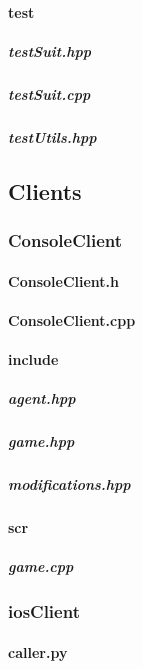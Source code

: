 \documentclass[12pt]{article}
\newcommand{\incFile}[2]{\label{code:#2}\newpage}
\begin{document}
\paragraph{test}																%
\subparagraph{testSuit.hpp}											\incFile{C++}{AlphaZeroPytorch/include/test/testSuit.hpp}	
\subparagraph{testSuit.cpp}											\incFile{C++}{AlphaZeroPytorch/include/test/testSuit.cpp}
\subparagraph{testUtils.hpp}											\incFile{C++}{AlphaZeroPytorch/include/test/testUtils.hpp}

\subsection{Clients}														%
\subsubsection{ConsoleClient}
\paragraph{ConsoleClient.h}											\incFile{C++}{Clients/ConsoleClient/ConsoleClient.h}
\paragraph{ConsoleClient.cpp}										\incFile{C++}{Clients/ConsoleClient/ConsoleClient.cpp}
\paragraph{include}														%
\subparagraph{agent.hpp}												\incFile{C++}{Clients/ConsoleClient/include/agent.hpp}
\subparagraph{game.hpp}												\incFile{C++}{Clients/ConsoleClient/include/game.hpp}
\subparagraph{modifications.hpp}								\incFile{C++}{Clients/ConsoleClient/include/modifications.hpp}
\paragraph{scr}																%
\subparagraph{game.cpp}												\incFile{C++}{Clients/ConsoleClient/scr/game.cpp}
\subsubsection{iosClient}												%
\paragraph{caller.py}														\incFile{python}{Clients/iosClient/caller.py}
\end{document}
